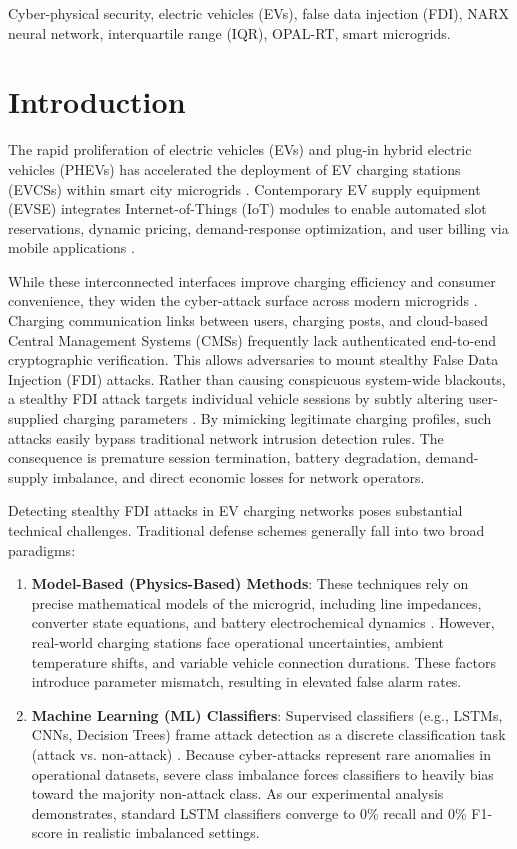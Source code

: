 \documentclass[conference]{IEEEtran}
\begin{document}
\begin{IEEEkeywords}
Cyber-physical security, electric vehicles (EVs), false data injection (FDI), NARX neural network, interquartile range (IQR), OPAL-RT, smart microgrids.
\end{IEEEkeywords}

\section{Introduction}
The rapid proliferation of electric vehicles (EVs) and plug-in hybrid electric vehicles (PHEVs) has accelerated the deployment of EV charging stations (EVCSs) within smart city microgrids \cite{Antoun2020}. Contemporary EV supply equipment (EVSE) integrates Internet-of-Things (IoT) modules to enable automated slot reservations, dynamic pricing, demand-response optimization, and user billing via mobile applications \cite{Sahoo2021}. 

While these interconnected interfaces improve charging efficiency and consumer convenience, they widen the cyber-attack surface across modern microgrids \cite{Nejabatkhah2021}. Charging communication links between users, charging posts, and cloud-based Central Management Systems (CMSs) frequently lack authenticated end-to-end cryptographic verification. This allows adversaries to mount stealthy False Data Injection (FDI) attacks. Rather than causing conspicuous system-wide blackouts, a stealthy FDI attack targets individual vehicle sessions by subtly altering user-supplied charging parameters \cite{Jahangir2024}. By mimicking legitimate charging profiles, such attacks easily bypass traditional network intrusion detection rules. The consequence is premature session termination, battery degradation, demand-supply imbalance, and direct economic losses for network operators.

Detecting stealthy FDI attacks in EV charging networks poses substantial technical challenges. Traditional defense schemes generally fall into two broad paradigms:
\begin{enumerate}
    \item \textbf{Model-Based (Physics-Based) Methods}: These techniques rely on precise mathematical models of the microgrid, including line impedances, converter state equations, and battery electrochemical dynamics \cite{Habibi2021}. However, real-world charging stations face operational uncertainties, ambient temperature shifts, and variable vehicle connection durations. These factors introduce parameter mismatch, resulting in elevated false alarm rates.
    \item \textbf{Machine Learning (ML) Classifiers}: Supervised classifiers (e.g., LSTMs, CNNs, Decision Trees) frame attack detection as a discrete classification task (attack vs. non-attack) \cite{Basnet2020, ElKashlan2023, Shafee2023}. Because cyber-attacks represent rare anomalies in operational datasets, severe class imbalance forces classifiers to heavily bias toward the majority non-attack class. As our experimental analysis demonstrates, standard LSTM classifiers converge to 0\% recall and 0\% F1-score in realistic imbalanced settings.
\end{enumerate}
\end{document}
